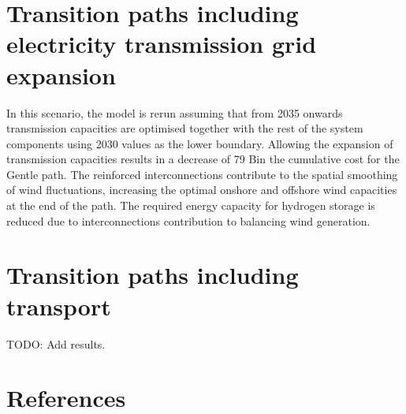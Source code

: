 \documentclass[3p]{elsarticle} %
\begin{document}

\section{Transition paths including electricity transmission grid expansion}

In this scenario, the model is rerun assuming that from 2035 onwards transmission capacities are optimised together with the rest of the system components using 2030 values as the lower boundary. Allowing the expansion of transmission capacities results in a decrease of 79 B\EUR in the cumulative cost for the Gentle path. The reinforced interconnections contribute to the spatial smoothing of wind fluctuations, increasing the optimal onshore and offshore wind capacities at the end of the path. The required energy capacity for hydrogen storage is reduced due to interconnections contribution to balancing wind generation. 

\FloatBarrier

\section{Transition paths including transport}

\textcolor[rgb]{1,0,0}{TODO: Add results.}

\section{References}

\end{document}
